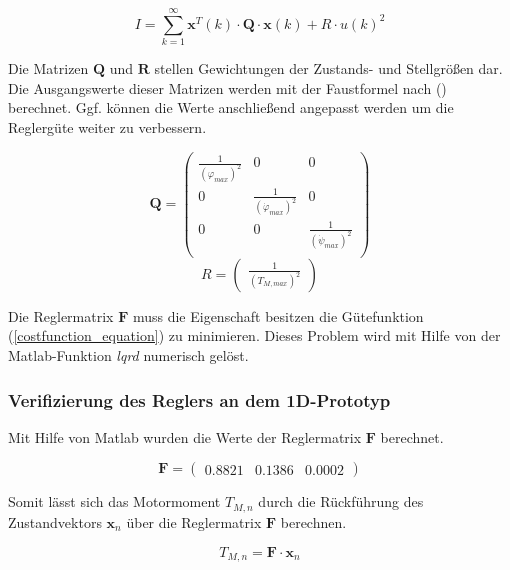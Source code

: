 \begin{equation}
\label{costfunction_equation}
I = \sum_{k=1}^\infty \textbf{x}^T(k) \cdot \textbf{Q} \cdot \textbf{x}(k) + R\cdot u(k)^2
\end{equation}

Die Matrizen $\textbf{Q}$ und $\textbf{R}$ stellen Gewichtungen der Zustands- und Stellgrößen dar. Die Ausgangswerte dieser Matrizen werden mit der Faustformel nach (\cite{lqrnotes}) berechnet. Ggf. können die Werte anschließend angepasst werden um die Reglergüte weiter zu verbessern.

\begin{equation}
\textbf{Q} = \begin{pmatrix}
\frac{1}{(\varphi_{max})^2} & 0 & 0 \\
0 & \frac{1}{(\dot{\varphi}_{max})^2} & 0 \\
0 & 0 & \frac{1}{(\dot{\psi}_{max})^2} \\
\end{pmatrix}
\end{equation}
\begin{equation}
R = \begin{pmatrix}
\frac{1}{(T_{M,max})^2}
\end{pmatrix}
\end{equation}

Die Reglermatrix $\textbf{F}$ muss die Eigenschaft besitzen die Gütefunktion (\ref{costfunction_equation}) zu minimieren. Dieses Problem wird mit Hilfe von der Matlab-Funktion \textit{lqrd} numerisch gelöst.

\subsubsection{Verifizierung des Reglers an dem 1D-Prototyp}
Mit Hilfe von Matlab wurden die Werte der Reglermatrix $\boldsymbol{F}$ berechnet.

\begin{equation}
\boldsymbol{F} = \begin{pmatrix}
0.8821 & 0.1386 & 0.0002
\end{pmatrix}
\end{equation}

Somit lässt sich das Motormoment $T_{M,n}$ durch die Rückführung des Zustandvektors $\boldsymbol{x}_n$ über die Reglermatrix $\boldsymbol{F}$ berechnen.

\begin{equation}
T_{M,n} = \boldsymbol{F} \cdot \boldsymbol{x}_n
\end{equation}


